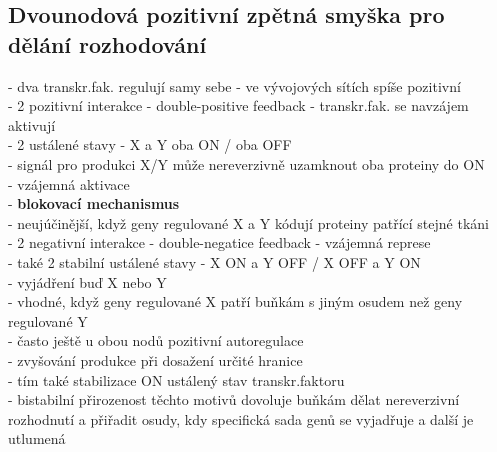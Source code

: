 \documentclass[11pt,a4paper]{report}
\begin{document}
\subsection{Dvounodová pozitivní zpětná smyška pro dělání rozhodování}
- dva transkr.fak. regulují samy sebe - ve vývojových sítích spíše pozitivní\\
\indent - 2 pozitivní interakce - double-positive feedback - transkr.fak. se navzájem aktivují\\
\indent \indent - 2 ustálené stavy - X a Y oba ON / oba OFF\\
\indent \indent - signál pro produkci X/Y může nereverzivně uzamknout oba proteiny do ON\\
\indent \indent \indent - vzájemná aktivace\\
\indent \indent \indent - \textbf{blokovací mechanismus}\\
\indent \indent - neujúčinější, když geny regulované X a Y kódují proteiny patřící stejné tkáni\\
\indent - 2 negativní interakce - double-negatice feedback - vzájemná represe\\
\indent \indent - také 2 stabilní ustálené stavy - X ON a Y OFF / X OFF a Y ON\\
\indent \indent \indent - vyjádření buď X nebo Y \\
\indent \indent - vhodné, když geny regulované X patří buňkám s jiným osudem než geny regulované Y\\
- často ještě u obou nodů pozitivní autoregulace\\
\indent - zvyšování produkce při dosažení určité hranice\\
\indent \indent - tím také stabilizace ON ustálený stav transkr.faktoru\\
- bistabilní přirozenost těchto motivů dovoluje buňkám dělat nereverzivní rozhodnutí a přiřadit osudy, kdy specifická sada genů se vyjadřuje a další je utlumená\\
\end{document}
